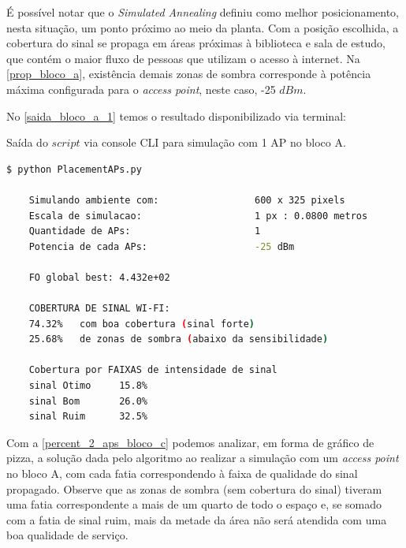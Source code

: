 \documentclass[
	12pt,				%
	twoside,			%
	a4paper,			%
	english,			%
	french,				%
	spanish,			%
	brazil				%
	]{abntex2}
\begin{document}
É possível notar que o \emph{Simulated Annealing} definiu como melhor
posicionamento, nesta situação, um ponto próximo ao meio da planta. Com
a posição escolhida, a cobertura do sinal se propaga em áreas próximas à
biblioteca e sala de estudo, que contém o maior fluxo de pessoas que
utilizam o acesso à internet. Na \autoref{prop_bloco_a}, existência
demais zonas de sombra corresponde à potência máxima configurada para o
\emph{access point}, neste caso, -25 \(dBm\).

No \autoref{saida_bloco_a_1} temos o resultado disponibilizado via
terminal:

\begin{quadro}[!htb]
    \caption{\label{saida_bloco_a_1} Saída do $script$ via console CLI para simulação com 1 AP no bloco A. }

    \begin{lstlisting}[language=bash]
    $ python PlacementAPs.py 

    Simulando ambiente com:                 600 x 325 pixels
    Escala de simulacao:                    1 px : 0.0800 metros
    Quantidade de APs:                      1
    Potencia de cada APs:                   -25 dBm

    FO global best: 4.432e+02

    COBERTURA DE SINAL WI-FI:
    74.32%   com boa cobertura (sinal forte)
    25.68%   de zonas de sombra (abaixo da sensibilidade)

    Cobertura por FAIXAS de intensidade de sinal
    sinal Otimo     15.8%
    sinal Bom       26.0%
    sinal Ruim      32.5%
    \end{lstlisting}
\end{quadro}

Com a \autoref{percent_2_aps_bloco_c} podemos analizar, em forma de
gráfico de pizza, a solução dada pelo algoritmo ao realizar a simulação
com um \emph{access point} no bloco A, com cada fatia correspondendo à
faixa de qualidade do sinal propagado. Observe que as zonas de sombra
(sem cobertura do sinal) tiveram uma fatia correspondente a mais de um
quarto de todo o espaço e, se somado com a fatia de sinal ruim, mais da
metade da área não será atendida com uma boa qualidade de serviço.
\end{document}
